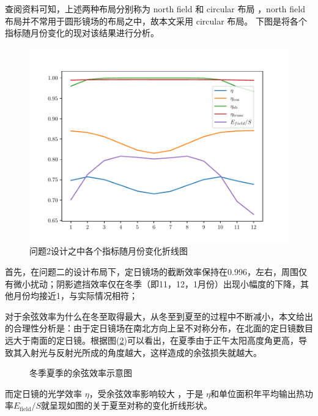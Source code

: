查阅资料可知，上述两种布局分别称为 north field 和 circular 布局 \cite{zhangML}，north field 布局并不常用于圆形镜场的布局之中，故本文采用 circular 布局。
下图是将各个指标随月份变化的现对该结果进行分析。
%
\begin{figure}[H]
\centering
\includegraphics[scale=0.5]{zhexiantu2.pdf}
\caption{\kaishu 问题2设计之中各个指标随月份变化折线图}\label{fig:zhexiantu2}
\end{figure}
%
首先，在问题二的设计布局下，定日镜场的截断效率保持在0.996，左右，周围仅有微小扰动；阴影遮挡效率仅在冬季（即11，12，1月份）出现小幅度的下降，其他月份均接近1，与实际情况相符；

对于余弦效率为什么在冬至取得最大，从冬至到夏至的过程中不断减小，本文给出的合理性分析是：由于定日镜场在南北方向上呈不对称分布，在北面的定日镜数目远大于南面的定日镜。根据图(\ref{summer_winter})可以看出，在夏季由于正午太阳高度角更高，导致其入射光与反射光所成的角度越大，这样造成的余弦损失就越大。
%
\begin{figure}[H]
\centering

\caption{\kaishu 冬季夏季的余弦效率示意图}\label{summer_winter}
\end{figure}
%
而定日镜的光学效率 \(\eta\)，受余弦效率影响较大 \cite{zhangML}，于是
\(\eta\)和单位面积年平均输出热功率\(E_{\mathrm{field}}/S\)就呈现如图的关于夏至对称的变化折线形状。

